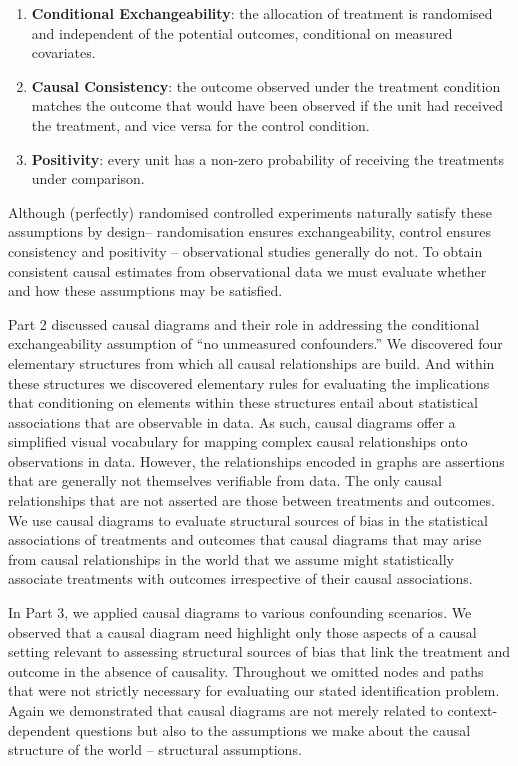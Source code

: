 \documentclass[
  singlecolumn]{article}
\begin{document}
\begin{enumerate}
\def\labelenumi{\arabic{enumi}.}
\item
  \textbf{Conditional Exchangeability}: the allocation of treatment is
  randomised and independent of the potential outcomes, conditional on
  measured covariates.
\item
  \textbf{Causal Consistency}: the outcome observed under the treatment
  condition matches the outcome that would have been observed if the
  unit had received the treatment, and vice versa for the control
  condition.
\item
  \textbf{Positivity}: every unit has a non-zero probability of
  receiving the treatments under comparison.
\end{enumerate}

Although (perfectly) randomised controlled experiments naturally satisfy
these assumptions by design-- randomisation ensures exchangeability,
control ensures consistency and positivity -- observational studies
generally do not. To obtain consistent causal estimates from
observational data we must evaluate whether and how these assumptions
may be satisfied.

Part 2 discussed causal diagrams and their role in addressing the
conditional exchangeability assumption of ``no unmeasured confounders.''
We discovered four elementary structures from which all causal
relationships are build. And within these structures we discovered
elementary rules for evaluating the implications that conditioning on
elements within these structures entail about statistical associations
that are observable in data. As such, causal diagrams offer a simplified
visual vocabulary for mapping complex causal relationships onto
observations in data. However, the relationships encoded in graphs are
assertions that are generally not themselves verifiable from data. The
only causal relationships that are not asserted are those between
treatments and outcomes. We use causal diagrams to evaluate structural
sources of bias in the statistical associations of treatments and
outcomes that causal diagrams that may arise from causal relationships
in the world that we assume might statistically associate treatments
with outcomes irrespective of their causal associations.

In Part 3, we applied causal diagrams to various confounding scenarios.
We observed that a causal diagram need highlight only those aspects of a
causal setting relevant to assessing structural sources of bias that
link the treatment and outcome in the absence of causality. Throughout
we omitted nodes and paths that were not strictly necessary for
evaluating our stated identification problem. Again we demonstrated that
causal diagrams are not merely related to context-dependent questions
but also to the assumptions we make about the causal structure of the
world -- structural assumptions.
\end{document}
